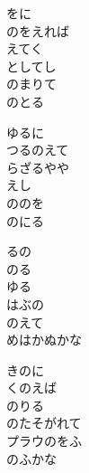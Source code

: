 \documentclass[10pt,b5j]{tarticle} %
\begin{document}
\vspace{1.5em} %
\newcommand{\linespace}{0.5em} %
\newcommand{\blocksize}{0.5\hsize} %
\begin{enumerate} %
    \begin{minipage}[c]{\blocksize}
    
        \vspace{\linespace}
        \item
        をに\\
        のをえれば\\
        えてく\\
        としてし\\
        のまりて\\
        のとる
        
        \vspace{\linespace}
        \item
        ゆるに\\
        つるのえて\\
        らざるやや\\
        えし\\
        ののを\\
        のにる
        
        \vspace{\linespace}
        \item
        るの\\
        のる\\
        ゆる\\
        はぶの\\
        のえて\\
        めはかぬかな
        
        \vspace{\linespace}
        \item
        きのに\\
        くのえば\\
        のりる\\
        のたそがれて\\
        プラウのをふ\\
        のふかな
        

\end{minipage}
\end{enumerate}
\end{document}
